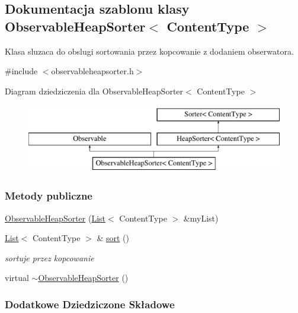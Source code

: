 \hypertarget{class_observable_heap_sorter}{\subsection{Dokumentacja szablonu klasy Observable\-Heap\-Sorter$<$ Content\-Type $>$}
\label{class_observable_heap_sorter}
}


Klasa sluzaca do obslugi sortowania przez kopcowanie z dodaniem obserwatora.  




{\ttfamily \#include $<$observableheapsorter.\-h$>$}

Diagram dziedziczenia dla Observable\-Heap\-Sorter$<$ Content\-Type $>$\begin{figure}[H]
\begin{center}
\leavevmode
\includegraphics[height=3.000000cm]{class_observable_heap_sorter}
\end{center}
\end{figure}
\subsubsection*{Metody publiczne}
\begin{DoxyCompactItemize}
\item 
\hyperlink{class_observable_heap_sorter_afc6079c41bb8424c65d350d1287b5e0e}{Observable\-Heap\-Sorter} (\hyperlink{class_list}{List}$<$ Content\-Type $>$ \&my\-List)
\item 
\hyperlink{class_list}{List}$<$ Content\-Type $>$ \& \hyperlink{class_observable_heap_sorter_aa56ec2ca7bd6498f0a0085946c464f36}{sort} ()
\begin{DoxyCompactList}\small\item\em sortuje przez kopcowanie \end{DoxyCompactList}\item 
virtual \hyperlink{class_observable_heap_sorter_a048e01a7e09297b25dc2cb5b1996506b}{$\sim$\-Observable\-Heap\-Sorter} ()
\end{DoxyCompactItemize}
\subsubsection*{Dodatkowe Dziedziczone Składowe}


